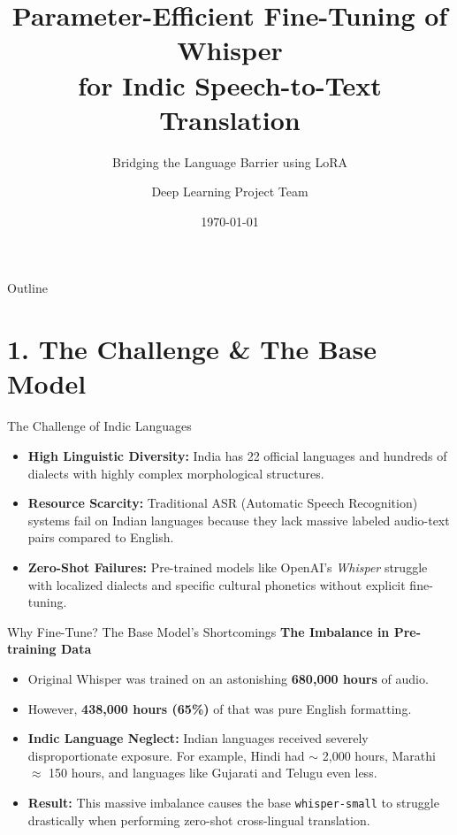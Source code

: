 \documentclass[aspectratio=169]{beamer}
\title[Indic Speech Translation]{Parameter-Efficient Fine-Tuning of Whisper\\for Indic Speech-to-Text Translation}
\subtitle{Bridging the Language Barrier using LoRA}
\author[Project Team]{Deep Learning Project Team}
\institute[University]{Machine Learning Challenge 2025}
\date{\today}
\begin{document}
\frame{\titlepage}

\begin{frame}{Outline}
    \tableofcontents
\end{frame}

\section{1. The Challenge \& The Base Model}
\begin{frame}{The Challenge of Indic Languages}
    \begin{itemize}
        \item \textbf{High Linguistic Diversity:} India has 22 official languages and hundreds of dialects with highly complex morphological structures.
        \item \textbf{Resource Scarcity:} Traditional ASR (Automatic Speech Recognition) systems fail on Indian languages because they lack massive labeled audio-text pairs compared to English.
        \item \textbf{Zero-Shot Failures:} Pre-trained models like OpenAI's \textit{Whisper} struggle with localized dialects and specific cultural phonetics without explicit fine-tuning.
    \end{itemize}
\end{frame}

\begin{frame}{Why Fine-Tune? The Base Model's Shortcomings}
    \textbf{The Imbalance in Pre-training Data}
    \begin{itemize}
        \item Original Whisper was trained on an astonishing \textbf{680,000 hours} of audio.
        \item However, \textbf{438,000 hours (65\%)} of that was pure English formatting.
        \item \textbf{Indic Language Neglect:} Indian languages received severely disproportionate exposure. For example, Hindi had $\sim$ 2,000 hours, Marathi $\approx$ 150 hours, and languages like Gujarati and Telugu even less.
        \item \textbf{Result:} This massive imbalance causes the base \texttt{whisper-small} to struggle drastically when performing zero-shot cross-lingual translation.
    \end{itemize}
\end{frame}
\end{document}
